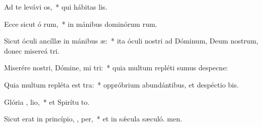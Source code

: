 \item Ad te levávi  os,~* qui hábitas  lis.
\item Ecce sicut ó rum,~* in mánibus dominórum rum.
\item Sicut óculi ancíllæ in mánibus  æ:~* ita óculi nostri ad Dóminum, Deum nostrum, donec misereá tri.
\item Miserére nostri, Dómine, mi tri:~* quia multum repléti sumus despecne:
\item Quia multum repléta est  tra:~* oppróbrium abundántibus, et despéctio bis.
\item Glória ,  lio,~* et Spirítu to.
\item Sicut erat in princípio,  ,  per,~* et in sǽcula sæculó. men.
